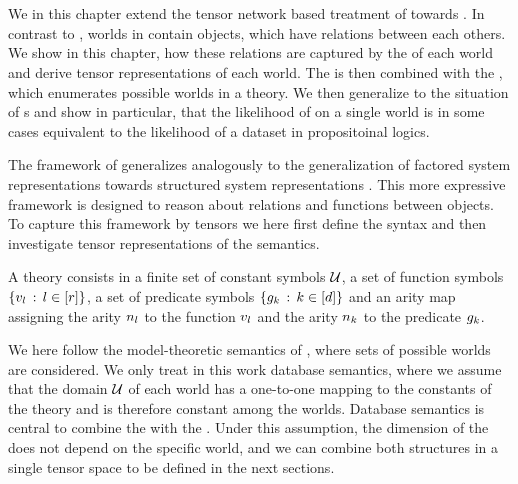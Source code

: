 \chapter{\chatextfolModels}\label{cha:folModels}

We in this chapter extend the tensor network based treatment of \propositionalLogic{} towards \firstOrderLogic{}.
In contrast to \propositionalLogic{}, worlds in \firstOrderLogic{} contain objects, which have relations between each others.
We show in this chapter, how these relations are captured by the \substitutionStructure{} of each world and derive tensor representations of each world.
The \substitutionStructure{} is then combined with the \semanticStructure{}, which enumerates possible worlds in a theory.
We then generalize \HybridLogicNetworks{} to the situation of \firstOrderLogic{}s and show in particular, that the likelihood of \HybridLogicNetworks{} on a single \firstOrderLogic{} world is in some cases equivalent to the likelihood of a dataset in propositoinal logics.


The framework of \firstOrderLogic{} generalizes \propositionalLogic{} analogously to the generalization of factored system representations towards structured system representations \cite{russell_artificial_2021}.
This more expressive framework is designed to reason about relations and functions between objects.
To capture this framework by tensors we here first define the syntax and then investigate tensor representations of the semantics.


A \firstOrderLogic{} theory consists in a finite set of constant symbols $\mathcal{U}$, a set of function symbols $\{v_{l}\,:\,l\in[r]\}$, a set of predicate symbols $\{g_{k}\,:\,k\in[d]\}$ and an arity map assigning the arity $n_{l}$ to the function $v_{l}$ and the arity $n_{k}$ to the predicate $g_{k}$.


We here follow the model-theoretic semantics of \firstOrderLogic{}, where sets of possible worlds are considered.
We only treat in this work database semantics, where we assume that the domain $\mathcal{U}$ of each world has a one-to-one mapping to the constants of the theory and is therefore constant among the worlds.
Database semantics is central to combine the \semanticStructure{} with the \substitutionStructure{}.
Under this assumption, the dimension of the \substitutionStructure{} does not depend on the specific world, and we can combine both structures in a single tensor space to be defined in the next sections.

